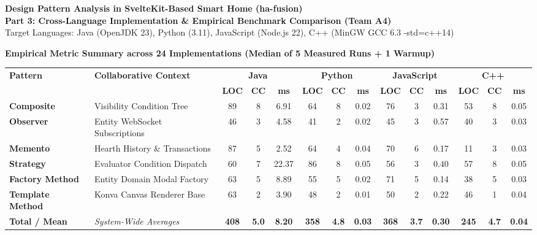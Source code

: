 \documentclass[landscape,10pt,a4paper]{article}
\begin{document}
\color{textdark}

\begin{tcolorbox}[colback=headerblue,colframe=headerblue,arc=3mm,boxrule=0mm]
\color{white}
\begin{center}
{\Large\textbf{Design Pattern Analysis in SvelteKit-Based Smart Home (ha-fusion)}}\\[1mm]
{\normalsize\textbf{Part 3: Cross-Language Implementation \& Empirical Benchmark Comparison (Team A4)}}\\[0.5mm]
{\footnotesize Target Languages: Java (OpenJDK 23), Python (3.11), JavaScript (Node.js 22), C++ (MinGW GCC 6.3 -std=c++14)}
\end{center}
\end{tcolorbox}

\vspace{-2mm}

\begin{center}
{\small\textbf{Empirical Metric Summary across 24 Implementations (Median of 5 Measured Runs + 1 Warmup)}}
\vspace{1mm}

\small
\begin{tabular}{ll ccc ccc ccc ccc}
\toprule
\textbf{Pattern} & \textbf{Collaborative Context} & \multicolumn{3}{c}{\textbf{Java}} & \multicolumn{3}{c}{\textbf{Python}} & \multicolumn{3}{c}{\textbf{JavaScript}} & \multicolumn{3}{c}{\textbf{C++}} \\
\cmidrule(lr){3-5} \cmidrule(lr){6-8} \cmidrule(lr){9-11} \cmidrule(lr){12-14}
 & & \textbf{LOC} & \textbf{CC} & \textbf{ms} & \textbf{LOC} & \textbf{CC} & \textbf{ms} & \textbf{LOC} & \textbf{CC} & \textbf{ms} & \textbf{LOC} & \textbf{CC} & \textbf{ms} \\
\midrule
\rowcolor{accentgray}
\textbf{Composite} & Visibility Condition Tree & 89 & 8 & 6.91 & 64 & 8 & 0.02 & 76 & 3 & 0.31 & 53 & 8 & 0.05 \\
\textbf{Observer} & Entity WebSocket Subscriptions & 46 & 3 & 4.58 & 41 & 2 & 0.02 & 45 & 3 & 0.57 & 40 & 3 & 0.03 \\
\rowcolor{accentgray}
\textbf{Memento} & Hearth History \& Transactions & 87 & 5 & 2.52 & 64 & 4 & 0.04 & 70 & 6 & 0.17 & 11 & 3 & 0.03 \\
\textbf{Strategy} & Evaluator Condition Dispatch & 60 & 7 & 22.37 & 86 & 8 & 0.05 & 56 & 3 & 0.40 & 57 & 8 & 0.05 \\
\rowcolor{accentgray}
\textbf{Factory Method} & Entity Domain Modal Factory & 63 & 5 & 8.89 & 55 & 5 & 0.02 & 71 & 5 & 0.14 & 38 & 5 & 0.03 \\
\textbf{Template Method} & Konva Canvas Renderer Base & 63 & 2 & 3.90 & 48 & 2 & 0.01 & 50 & 2 & 0.22 & 46 & 1 & 0.04 \\
\midrule
\textbf{Total / Mean} & \textit{System-Wide Averages} & \textbf{408} & \textbf{5.0} & \textbf{8.20} & \textbf{358} & \textbf{4.8} & \textbf{0.03} & \textbf{368} & \textbf{3.7} & \textbf{0.30} & \textbf{245} & \textbf{4.7} & \textbf{0.04} \\
\bottomrule
\end{tabular}
\end{center}
\end{document}
